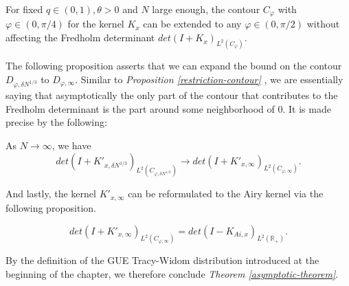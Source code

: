 \begin{proposition} 
For fixed $q \in (0,1), \theta > 0$ and $N$ large enough, the contour $C_{\varphi}$ with $\varphi \in (0, \pi / 4)$ for the kernel $K_x$ can be extended to any $\varphi \in (0, \pi / 2)$ without affecting the Fredholm determinant $det(I+K_x)_{L^2(C_{\varphi})}$.
\end{proposition}

The following proposition asserts that we can expand the bound on the contour $D_{\varphi, \delta N^{1/3}}$ to $D_{\varphi, \infty}$. Similar to \textit{Proposition \ref{restriction-contour} }, we are essentially saying that asymptotically the only part of the contour that contributes to the Fredholm determinant is the part around some neighborhood of $0$. It is made precise by the following:

\begin{proposition} 
As $N \rightarrow \infty$, we have $$det(I+K'_{x, \delta N^{1/3}})_{L^2(C_{\varphi, \delta N^{1/3}})} \rightarrow det(I+K'_{x, \infty})_{L^2(C_{\varphi, \infty})}.$$
\end{proposition}

And lastly, the kernel $K'_{x, \infty}$ can be reformulated to the Airy kernel via the following proposition.
\begin{proposition} 

$$det(I+K'_{x,\infty})_{L^2(C_{\varphi, \infty})} = det(I - K_{Ai, x})_{L^2(\mathbb{R}_+)}.$$
\end{proposition}

By the definition of the GUE Tracy-Widom distribution introduced at the beginning of the chapter, we therefore conclude \textit{Theorem \ref{asymptotic-theorem}}.

